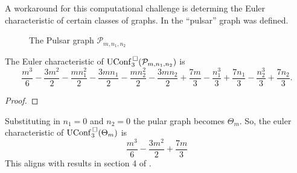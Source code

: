 A workaround for this computational challenge is determing the Euler characteristic of certain classes of graphs.
In \cite{appiah2024algebraicstructurehyperbolicgraph} the ``pulsar'' graph was defined.


\begin{figure}[h!]
    \centering
{}
\label{fig:pulsargraph}
\caption{The Pulsar graph \(\mathcal{P}_{m,n_1,n_2}\)}
\end{figure}

\begin{thm}
    \label{thm:pulsargrapheuler}
    The Euler characteristic of \(\mathrm{UConf}^{\,\square}_{3}(\mathcal{P}_{m,n_1,n_2})\) is
    \[
    \frac{m^{3}}{6} - \frac{3 m^{2}}{2} - \frac{m n_{1}^{2}}{2} - \frac{3 m n_{1}}{2} - \frac{m n_{2}^{2}}{2} - \frac{3 m n_{2}}{2} + \frac{7 m}{3} - \frac{n_{1}^{3}}{3} + \frac{7 n_{1}}{3} - \frac{n_{2}^{3}}{3} + \frac{7 n_{2}}{3}.
    \]
\end{thm}
\begin{proof}
\end{proof}

\begin{rem}
Substituting in \(n_1 = 0\) and \(n_2 = 0\) the pular graph becomes \(\Theta_m\).
So, 
the euler characteristic of \(\mathrm{UConf}^{\,\square}_3(\Theta_m)\) is
\[
\frac{m^{3}}{6} - \frac{3 m^{2}}{2} + \frac{7 m}{3}
\]
This aligns with results in section 4 of \cite{appiah2024algebraicstructurehyperbolicgraph}.
\end{rem}